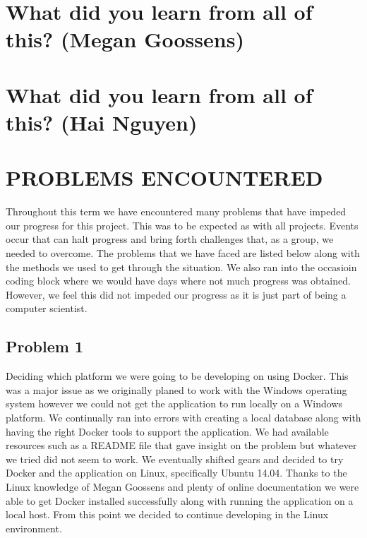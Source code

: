 \documentclass[draftclsnofoot,10pt,onecolumn]{IEEEtran} %
\begin{document}
\begin{enumerate}
\section{What did you learn from all of this? (Megan Goossens)}

\section{What did you learn from all of this? (Hai Nguyen)}


\section{PROBLEMS ENCOUNTERED}

Throughout this term we have encountered many problems that have impeded our
progress for this project. This was to be expected as with all projects. 
Events
occur that can halt progress and bring forth challenges that, as a group, we
needed to overcome. The problems that we have faced are listed below along with
the methods we used to get through the situation. We also ran into the occasioin coding block where we would have days where not much progress was obtained. However, we feel this did not impeded our progress as
it is just part of being a computer scientist.

\subsection{Problem 1}
Deciding which platform we were going to be developing on using Docker. This was
a major issue as we originally planed to work with the Windows operating system
however we could not get the application to run locally on a Windows platform.
We continually ran into errors with creating a local database along with having
the right Docker tools to support the application. We had available resources
such as a README file that gave insight on the problem but whatever we tried did
not seem to work. We eventually shifted gears and decided to try Docker and the
application on Linux, specifically Ubuntu 14.04. Thanks to the Linux knowledge
of Megan Goossens and plenty of online documentation we were able to get Docker
installed successfully along with running the application on a local host. From
this point we decided to continue developing in the Linux environment.


\end{enumerate}
\end{document}
